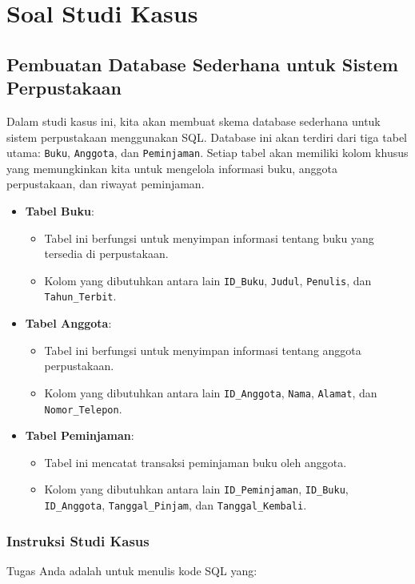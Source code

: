 \section{Soal Studi Kasus}

\subsection{Pembuatan Database Sederhana untuk Sistem Perpustakaan}
Dalam studi kasus ini, kita akan membuat skema database sederhana untuk sistem perpustakaan menggunakan SQL. Database ini akan terdiri dari tiga tabel utama: \texttt{Buku}, \texttt{Anggota}, dan \texttt{Peminjaman}. Setiap tabel akan memiliki kolom khusus yang memungkinkan kita untuk mengelola informasi buku, anggota perpustakaan, dan riwayat peminjaman.

\begin{itemize}
	\item \textbf{Tabel Buku}:
	\begin{itemize}
		\item Tabel ini berfungsi untuk menyimpan informasi tentang buku yang tersedia di perpustakaan.
		\item Kolom yang dibutuhkan antara lain \texttt{ID\_Buku}, \texttt{Judul}, \texttt{Penulis}, dan \texttt{Tahun\_Terbit}.
	\end{itemize}
	
	\item \textbf{Tabel Anggota}:
	\begin{itemize}
		\item Tabel ini berfungsi untuk menyimpan informasi tentang anggota perpustakaan.
		\item Kolom yang dibutuhkan antara lain \texttt{ID\_Anggota}, \texttt{Nama}, \texttt{Alamat}, dan \texttt{Nomor\_Telepon}.
	\end{itemize}
	
	\item \textbf{Tabel Peminjaman}:
	\begin{itemize}
		\item Tabel ini mencatat transaksi peminjaman buku oleh anggota.
		\item Kolom yang dibutuhkan antara lain \texttt{ID\_Peminjaman}, \texttt{ID\_Buku}, \texttt{ID\_Anggota}, \texttt{Tanggal\_Pinjam}, dan \texttt{Tanggal\_Kembali}.
	\end{itemize}
\end{itemize}

\subsubsection{Instruksi Studi Kasus}
Tugas Anda adalah untuk menulis kode SQL yang:

